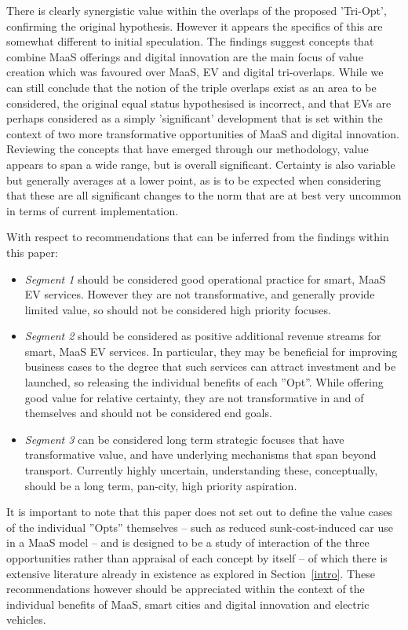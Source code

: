 \documentclass[journal]{IEEEtran}
\begin{document}
There is clearly synergistic value within the overlaps of the proposed
'Tri-Opt', confirming the original hypothesis. However it appears the
specifics of this are somewhat different to initial speculation. The
findings suggest concepts that combine MaaS offerings and digital
innovation are the main focus of value creation which was favoured over
MaaS, EV and digital tri-overlaps. While we can still conclude that
the notion of the triple overlaps exist as an area to be considered,
the original equal status hypothesised is incorrect, and that EVs are
perhaps considered as a simply 'significant' development that is set within the
context of two more transformative opportunities of MaaS and digital
innovation. Reviewing the concepts that have emerged through our
methodology, value appears to span a wide range, but is overall
significant. Certainty is also variable but generally averages at a
lower point, as is to be expected when considering that these are all significant changes to the norm that are at best very uncommon in terms of current implementation. 

With respect to recommendations that can be inferred from the findings
within this paper:

\begin{itemize}
\item {\emph{Segment 1}} should be considered good operational practice for
  smart, MaaS EV services. However they are not transformative, and
  generally provide limited value, so should not be considered high
  priority focuses. 
\item {\emph{Segment 2}} should be considered as positive additional revenue
  streams for smart, MaaS EV services. In particular, they may be
  beneficial for improving business cases to the degree that such
  services can attract investment and be launched, so releasing the
  individual benefits of each ''Opt''. While offering good value for
  relative certainty, they are not transformative in and of themselves
  and should not be considered end goals.
\item {\emph{Segment 3}} can be considered long term strategic focuses that
  have transformative value, and have underlying mechanisms that span
  beyond transport. Currently highly uncertain, understanding these,
  conceptually, should be a long term, pan-city, high priority
  aspiration.
\end{itemize}

It is important to note that this paper does not set out to define the
value cases of the individual ''Opts'' themselves -- such as reduced
sunk-cost-induced car use in a MaaS model -- and is designed to be a
study of interaction of the three opportunities rather than appraisal
of each concept by itself -- of which there is extensive literature
already in existence as explored in Section~\ref{intro}. These
recommendations however should be appreciated within the context of
the individual benefits of MaaS, smart cities and digital innovation
and electric vehicles.
\end{document}
